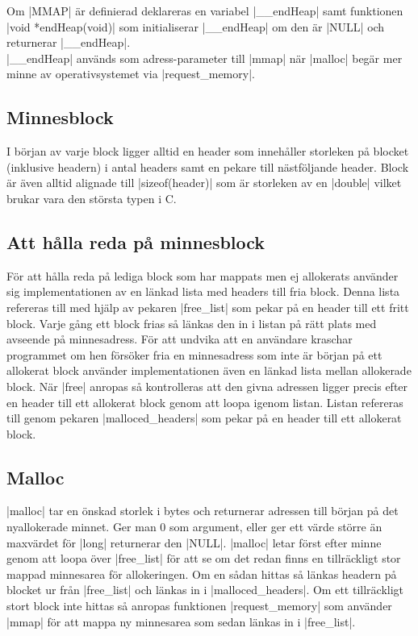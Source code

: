 \documentclass[paper=a4, fontsize=11pt]{scrartcl} %
\numberwithin{equation}{section} %
\numberwithin{figure}{section} %
\numberwithin{table}{section} %
\begin{document}
%
%
Om |MMAP| är definierad deklareras en variabel |__endHeap| samt funktionen 
|void *endHeap(void)| som initialiserar |__endHeap| om den är |NULL| och
returnerar |__endHeap|.\\

|__endHeap| används som adress-parameter till |mmap| när |malloc| begär 
mer minne av operativsystemet via |request_memory|.

\subsection{Minnesblock}
I början av varje block ligger alltid en header som innehåller storleken på
blocket (inklusive headern) i antal headers samt en pekare till nästföljande
header.
Block är även alltid alignade till |sizeof(header)| som är storleken av en
|double| vilket brukar vara den största typen i C.

\subsection{Att hålla reda på minnesblock}

För att hålla reda på lediga block som har mappats men ej allokerats använder
sig implementationen av en länkad lista med headers till fria block.
Denna lista refereras till med hjälp av pekaren |free_list| som pekar på en
header till ett fritt block.
Varje gång ett block frias så länkas den in i listan på rätt plats med avseende
på minnesadress.
För att undvika att en användare kraschar programmet om hen försöker fria en
minnesadress som inte är början på ett allokerat block använder
implementationen även en länkad lista mellan allokerade block.
När |free| anropas så kontrolleras att den givna adressen ligger precis efter
en header till ett allokerat block genom att loopa igenom listan.
Listan refereras till genom pekaren |malloced_headers| som pekar på en header
till ett allokerat block.

\subsection{Malloc}
|malloc| tar en önskad storlek i bytes och returnerar adressen till början på
det nyallokerade minnet.
Ger man 0 som argument, eller ger ett värde större än maxvärdet för |long|
returnerar den |NULL|.
|malloc| letar först efter minne genom att loopa över |free_list| för att se om
det redan finns en tillräckligt stor mappad minnesarea för allokeringen.
Om en sådan hittas så länkas headern på blocket ur från |free_list| och länkas
in i |malloced_headers|.
Om ett tillräckligt stort block inte hittas så anropas funktionen
|request_memory| som använder |mmap| för att mappa ny minnesarea som sedan
länkas in i |free_list|.
\end{document}
